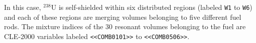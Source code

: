\vskip 0.15cm

In this case, $^{238}$U is self-shielded within six distributed regions (labeled
{\tt W1} to {\tt W6}) and each of these regions are merging volumes belonging
to five different fuel rods. The mixture indices of the 30 resonant volumes belonging
to the fuel are CLE-2000 variables labeled {\tt <<COMB0101>>} to {\tt <<COMB0506>>}.

\eject
